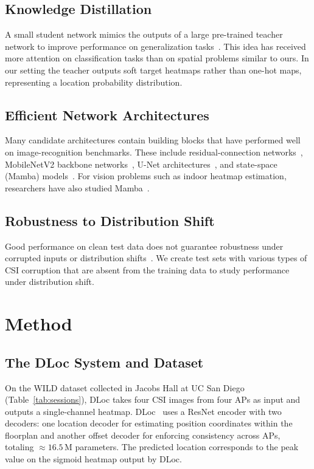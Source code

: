 \documentclass[conference]{IEEEtran}
\begin{document}
\subsection{Knowledge Distillation}
A small student network mimics the outputs of a large pre-trained teacher network to improve performance on generalization tasks~\cite{hinton2015distilling}. This idea has received more attention on classification tasks than on spatial problems similar to ours. In our setting the teacher outputs soft target heatmaps rather than one-hot maps, representing a location probability distribution.

\subsection{Efficient Network Architectures}
Many candidate architectures contain building blocks that have performed well on image-recognition benchmarks. These include residual-connection networks~\cite{he2016resnet}, MobileNetV2 backbone networks~\cite{sandler2018mobilenetv2}, U-Net architectures~\cite{ronneberger2015unet}, and state-space (Mamba) models~\cite{gu2023mamba}. For vision problems such as indoor heatmap estimation, researchers have also studied Mamba~\cite{visualmamba2024survey}.

\subsection{Robustness to Distribution Shift}
Good performance on clean test data does not guarantee robustness under corrupted inputs or distribution shifts~\cite{hendrycks2019robustness}. We create test sets with various types of CSI corruption that are absent from the training data to study performance under distribution shift.

\section{Method}
\subsection{The DLoc System and Dataset}
On the WILD dataset collected in Jacobs Hall at UC San Diego (Table~\ref{tab:sessions}), DLoc takes four CSI images from four APs as input and outputs a single-channel heatmap. DLoc~\cite{ayyalasomayajula2020deep} uses a ResNet encoder with two decoders: one location decoder for estimating position coordinates within the floorplan and another offset decoder for enforcing consistency across APs, totaling ${\approx}16.5$\,M parameters. The predicted location corresponds to the peak value on the sigmoid heatmap output by DLoc.
\end{document}

